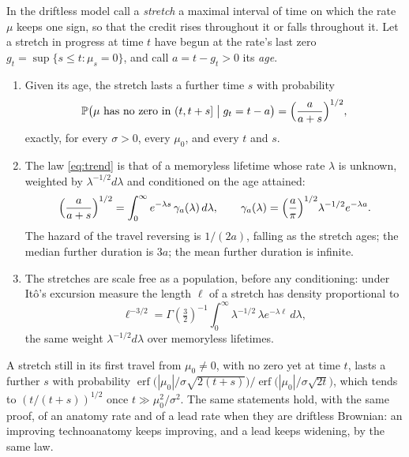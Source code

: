 \begin{proposition}\label{prop:trend}
In the driftless model call a \emph{stretch} a maximal interval of time on
which the rate $\mu$ keeps one sign, so that the credit rises throughout
it or falls throughout it. Let a stretch in progress at time $t$ have
begun at the rate's last zero $g_t=\sup\{s\le t:\mu_s=0\}$, and call
$a=t-g_t>0$ its \emph{age}.
\begin{enumerate}[label=\emph{(\roman*)},itemsep=1pt]
\item Given its age, the stretch lasts a further time $s$ with probability
\begin{equation}\label{eq:trend}
\mathbb{P}\bigl(\mu\text{ has no zero in }(t,t+s]\bigm|g_t=t-a\bigr)
=\Bigl(\frac{a}{a+s}\Bigr)^{1/2},
\end{equation}
exactly, for every $\sigma>0$, every $\mu_0$, and every $t$ and $s$.
\item The law \eqref{eq:trend} is that of a memoryless lifetime whose
rate $\lambda$ is unknown, weighted by $\lambda^{-1/2}d\lambda$ and
conditioned on the age attained:
\begin{equation}\label{eq:trendmix}
\Bigl(\frac{a}{a+s}\Bigr)^{1/2}=\int_0^\infty e^{-\lambda s}\,\gamma_a(\lambda)\,d\lambda,
\qquad
\gamma_a(\lambda)=\Bigl(\frac{a}{\pi}\Bigr)^{1/2}\lambda^{-1/2}e^{-\lambda a}.
\end{equation}
The hazard of the travel reversing is $1/(2a)$, falling as the stretch
ages; the median further duration is $3a$; the mean further duration is
infinite.
\item The stretches are scale free as a population, before any
conditioning: under It\^o's excursion measure the length $\ell$ of a
stretch has density proportional to
\[
\ell^{-3/2}=\Gamma(\tfrac32)^{-1}\int_0^\infty\lambda^{-1/2}\,\lambda e^{-\lambda\ell}\,d\lambda,
\]
the same weight $\lambda^{-1/2}d\lambda$ over memoryless lifetimes.
\end{enumerate}
A stretch still in its first travel from $\mu_0\neq0$, with no zero yet at
time $t$, lasts a further $s$ with probability
$\operatorname{erf}\bigl(|\mu_0|/\sigma\sqrt{2(t+s)}\bigr)/\operatorname{erf}\bigl(|\mu_0|/\sigma\sqrt{2t}\bigr)$,
which tends to $(t/(t+s))^{1/2}$ once $t\gg\mu_0^2/\sigma^2$. The same
statements hold, with the same proof, of an anatomy rate and of a lead
rate when they are driftless Brownian: an improving technoanatomy keeps
improving, and a lead keeps widening, by the same law.
\end{proposition}

